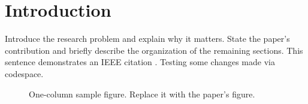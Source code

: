 \section{Introduction}
Introduce the research problem and explain why it matters. State the paper's contribution and briefly describe the organization of the remaining sections. This sentence demonstrates an IEEE citation \cite{example2026}.
Testing some changes made via codespace.
\begin{figure}[!t]
	\centering
	
	\caption{One-column sample figure. Replace it with the paper's figure.}
	\label{fig:one-column-example}
\end{figure}